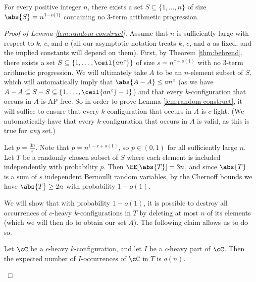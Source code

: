 \begin{theorem}\label{thm:behrend}
    For every positive integer $n$, there exists a set $S \subseteq \{1, \ldots, n\}$ of size $\abs{S} = n^{1 - o(1)}$ containing no $3$-term arithmetic progression. 
\end{theorem}

\begin{proof}[Proof of Lemma \ref{lem:random-construct}]
    Assume that $n$ is sufficiently large with respect to $k$, $c$, and $a$ (all our asymptotic notation treats $k$, $c$, and $a$ as fixed, and the implied constants will depend on them). First, by Theorem \ref{thm:behrend}, there exists a set $S \subseteq \{1, \ldots, \ceil{an^c}\}$ of size $s = n^{c - o(1)}$ with no $3$-term arithmetic progression. We will ultimately take $A$ to be an $n$-element subset of $S$, which will automatically imply that $\abs{A - A} \leq an^c$ (as we have $A - A \subseteq S - S \subseteq \{1, \ldots, \ceil{an^c} - 1\}$) and that every $k$-configuration that occurs in $A$ is AP-free. So in order to prove Lemma \ref{lem:random-construct}, it will suffice to ensure that every $k$-configuration that occurs in $A$ is $c$-light. (We automatically have that every $k$-configuration that occurs in $A$ is valid, as this is true for \emph{any} set.)

    Let $p = \frac{3n}{s}$. Note that $p = n^{1 - c + o(1)}$, so $p \in (0, 1)$ for all sufficiently large $n$. Let $T$ be a randomly chosen subset of $S$ where each element is included independently with probability $p$. Then $\EE[\abs{T}] = 3n$, and since $\abs{T}$ is a sum of $s$ independent Bernoulli random variables, by the Chernoff bounds we have $\abs{T} \geq 2n$ with probability $1 - o(1)$. 

    We will show that with probability $1 - o(1)$, it is possible to destroy all occurrences of $c$-heavy $k$-configurations in $T$ by deleting at most $n$ of its elements (which we will then do to obtain our set $A$). The following claim allows us to do so. 

    \begin{claim}\label{claim:heavy-occs}
        Let $\cC$ be a $c$-heavy $k$-configuration, and let $I$ be a $c$-heavy part of $\cC$. Then the expected number of $I$-occurrences of $\cC$ in $T$ is $o(n)$. 
    \end{claim}


\end{proof}
